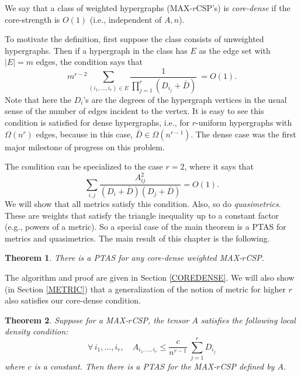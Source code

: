 \documentclass{book}
\newtheorem{theorem}{Theorem}[chapter]
\numberwithin{exercise}{chapter}
\begin{document}
We say that a class of weighted hypergraphs (MAX-$r$CSP's)
is {\em core-dense} if the core-strength is $O(1)$
(i.e., independent of $A,n$).

To motivate the definition, first suppose
the class consists of unweighted hypergraphs.
Then if a hypergraph in the class has $E$ as the edge set
with $|E|=m$ edges, the condition says that
\begin{equation}\label{HYPERGRAPH}
m^{r-2} \sum_{(i_1,\ldots, i_r) \in E} \frac{1}{\prod_{j=1}^r (D_{i_j}+\bar{D})}  \
= O(1).
\end{equation}
Note that here the $D_i$'s are the degrees of the hypergraph vertices in the
usual sense of the number of edges incident to the vertex.
It is easy to see this condition is satisfied for dense hypergraphs, i.e.,
for $r$-uniform hypergraphs with $\Omega (n^r)$ edges, because in this
case, $\bar D\in \Omega(n^{r-1})$. The dense case was the first major milestone of progress on this problem.

The condition can be specialized to the case $r=2$, where it says that
\begin{equation}\label{GRAPH}
\sum_{i,j}\frac{A_{ij}^2}{(D_i+\bar{D})(D_j+\bar{D})} = O(1).
\end{equation}
We will show that all metrics satisfy this condition. Also, so do
{\em quasimetrics}. These are weights that satisfy the triangle
inequality up to a constant factor (e.g., powers of a metric).
So a special case of the main theorem is a PTAS for metrics and quasimetrics.
The main result of this chapter is the following.
\begin{theorem}\label{thm:coredense}
There is a PTAS for any core-dense weighted MAX-$r$CSP.
\end{theorem}
The algorithm and proof are given in Section \ref{COREDENSE}.
We will also show (in Section \ref{METRIC}) that a generalization of the notion
of metric for higher $r$ also satisfies our core-dense condition.
\begin{theorem}\label{LOCAL}
Suppose for a MAX-$r$CSP,
the tensor $A$ satisfies the following local density condition:
\[
\forall \, i_1, \ldots, i_r, \quad A_{i_1,\ldots,i_r} \le \frac{c}{n^{r-1}}\
 \sum_{j=1}^r
D_{i_j}
\]
where $c$ is a constant. Then there is a PTAS for the MAX-$r$CSP
defined by $A$.
\end{theorem}
\end{document}
